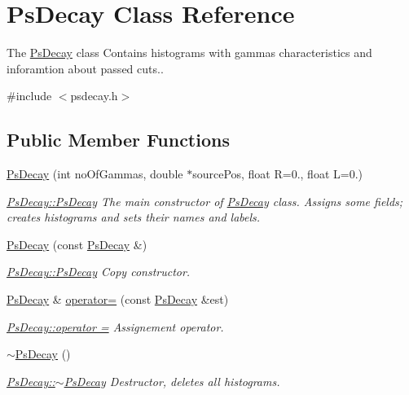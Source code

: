 \hypertarget{classPsDecay}{}\section{Ps\+Decay Class Reference}
\label{classPsDecay}


The \hyperlink{classPsDecay}{Ps\+Decay} class Contains histograms with gammas\textquotesingle{} characteristics and inforamtion about passed cuts..  




{\ttfamily \#include $<$psdecay.\+h$>$}

\subsection*{Public Member Functions}
\begin{DoxyCompactItemize}
\item 
\hyperlink{classPsDecay_a72fd76a6033f64d2e004529ccf1a316c}{Ps\+Decay} (int no\+Of\+Gammas, double $\ast$source\+Pos, float R=0., float L=0.)
\begin{DoxyCompactList}\small\item\em \hyperlink{classPsDecay_a72fd76a6033f64d2e004529ccf1a316c}{Ps\+Decay\+::\+Ps\+Decay} The main constructor of \hyperlink{classPsDecay}{Ps\+Decay} class. Assigns some fields; creates histograms and sets their names and labels. \end{DoxyCompactList}\item 
\hyperlink{classPsDecay_a572b4252d8fee9cf74912bc5028aacdd}{Ps\+Decay} (const \hyperlink{classPsDecay}{Ps\+Decay} \&)
\begin{DoxyCompactList}\small\item\em \hyperlink{classPsDecay_a72fd76a6033f64d2e004529ccf1a316c}{Ps\+Decay\+::\+Ps\+Decay} Copy constructor. \end{DoxyCompactList}\item 
\hyperlink{classPsDecay}{Ps\+Decay} \& \hyperlink{classPsDecay_a90bd9f4ce937cc828fef2bcf254005a9}{operator=} (const \hyperlink{classPsDecay}{Ps\+Decay} \&est)
\begin{DoxyCompactList}\small\item\em \hyperlink{classPsDecay_a90bd9f4ce937cc828fef2bcf254005a9}{Ps\+Decay\+::operator =} Assignement operator. \end{DoxyCompactList}\item 
\hyperlink{classPsDecay_a18464d58ecac1d13983a170a86b37910}{$\sim$\+Ps\+Decay} ()
\begin{DoxyCompactList}\small\item\em \hyperlink{classPsDecay_a18464d58ecac1d13983a170a86b37910}{Ps\+Decay\+::$\sim$\+Ps\+Decay} Destructor, deletes all histograms. \end{DoxyCompactList}\item 

\end{DoxyCompactItemize}
